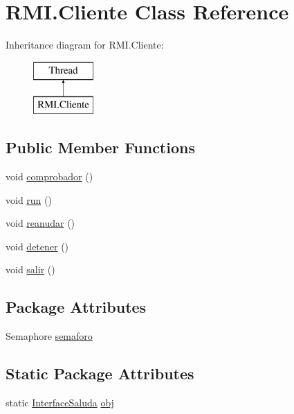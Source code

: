 \hypertarget{class_r_m_i_1_1_cliente}{}\section{R\+M\+I.\+Cliente Class Reference}
\label{class_r_m_i_1_1_cliente}
Inheritance diagram for R\+M\+I.\+Cliente\+:\begin{figure}[H]
\begin{center}
\leavevmode
\includegraphics[height=2.000000cm]{class_r_m_i_1_1_cliente}
\end{center}
\end{figure}
\subsection*{Public Member Functions}
\begin{DoxyCompactItemize}
\item 
void \mbox{\hyperlink{class_r_m_i_1_1_cliente_af1963dfc32e418055908fd85f49143e0}{comprobador}} ()
\item 
void \mbox{\hyperlink{class_r_m_i_1_1_cliente_a6ecb7f16d4b6a7dc46ce4302f45a0fe9}{run}} ()
\item 
void \mbox{\hyperlink{class_r_m_i_1_1_cliente_ae9504706637d8e4abfe5e11760fa9ce9}{reanudar}} ()
\item 
void \mbox{\hyperlink{class_r_m_i_1_1_cliente_a5b7c4cee8614116c01643bf47de62e7a}{detener}} ()
\item 
void \mbox{\hyperlink{class_r_m_i_1_1_cliente_ae6ed71195a80194555ce07416ca64406}{salir}} ()
\end{DoxyCompactItemize}
\subsection*{Package Attributes}
\begin{DoxyCompactItemize}
\item 
Semaphore \mbox{\hyperlink{class_r_m_i_1_1_cliente_aded0f4d7b773e89ec8c162cf94c83504}{semaforo}}
\end{DoxyCompactItemize}
\subsection*{Static Package Attributes}
\begin{DoxyCompactItemize}
\item 
static \mbox{\hyperlink{interface_r_m_i_1_1_interface_saluda}{Interface\+Saluda}} \mbox{\hyperlink{class_r_m_i_1_1_cliente_ac0b62b87dd4c8edc00a335d7f029f8fa}{obj}}
\end{DoxyCompactItemize}


